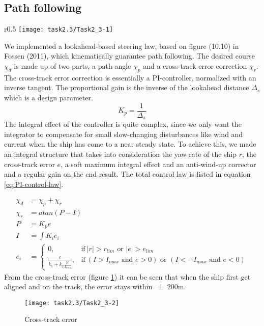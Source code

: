 \subsection{Path following}\label{subsec:prob2.2}
\begin{wrapfigure}{r}{0.5 \textwidth}
   \vspace{-30pt}
   \centering
    \texttt{[image: task2.3/Task2\_3-1]}
    \vspace{-20pt}
    \caption{Path following}
    \label{fig:2.3-path}
    \vspace{-10pt}
\end{wrapfigure}

We implemented a lookahead-based steering law, based on figure (10.10) in Fossen (2011), which kinematically guarantee path following. The desired course $\chi_d$ is made up of two parts, a path-angle $\chi_p$ and a cross-track error correction $\chi_r$. The cross-track error correction is essentially a PI-controller, normalized with an inverse tangent. The proportional gain is the inverse of the lookahead distance $\Delta_s$ which is a design parameter.
\begin{equation}
	K_p = \frac{1}{\Delta_s}
\end{equation}
The integral effect of the controller is quite complex, since we only want the integrator to compensate for small slow-changing disturbances like wind and current when the ship has come to a near steady state. To achieve this, we made an integral structure that takes into consideration the yaw rate of the ship $r$, the cross-track error $e$, a soft maximum integral effect and an anti-wind-up corrector and a regular gain on the end result. The total control law is listed in equation \ref{eq:PI-control-law}.

\begin{equation}
\begin{split}
	\chi_d &= \chi_p + \chi_r \\
	\chi_r &= atan(P - I) \\
	P &= K_p e \\
	I &= \int K_i e_i \\
	e_i &=	\begin{cases}
			0,								& \text{if}\ | r | > r_{lim} \text{ or }  | e | > e_{lim} \\
      			\frac{e}{k_1+k_2 \frac{| I |}{I_{max}}},		& \text{if}\ (I > I_{max} \text{ and } e>0) \text{ or }( I< -I_{max} \text{ and } e<0 )
      			\end{cases}
\end{split}
\label{eq:PI-control-law}
\end{equation}
From the cross-track error (figure \ref{fig:2.3-error}) it can be seen that when the ship first get aligned and on the track, the error stays within \num{\pm200}{m}.

\begin{figure}[ht]
   \centering
    \texttt{[image: task2.3/Task2\_3-2]}
    \caption{Cross-track error}
    \label{fig:2.3-error}
\end{figure}


